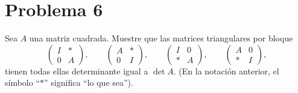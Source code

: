 \documentclass[11pt]{article}
\theoremstyle{definition} %
\begin{document}
\section*{Problema 6}
Sea \(A\) una matriz cuadrada. Muestre que las matrices triangulares por bloque
\[
  \begin{pmatrix} I & \ast\\[2pt] 0 & A\end{pmatrix},\qquad
  \begin{pmatrix} A & \ast\\[2pt] 0 & I\end{pmatrix},\qquad
  \begin{pmatrix} I & 0\\[2pt] \ast & A\end{pmatrix},\qquad
  \begin{pmatrix} A & 0\\[2pt] \ast & I\end{pmatrix},
\]
tienen todas ellas determinante igual a \(\det A\). (En la notación anterior, el símbolo ``\(\ast\)'' significa ``lo que sea'').
\end{document}

